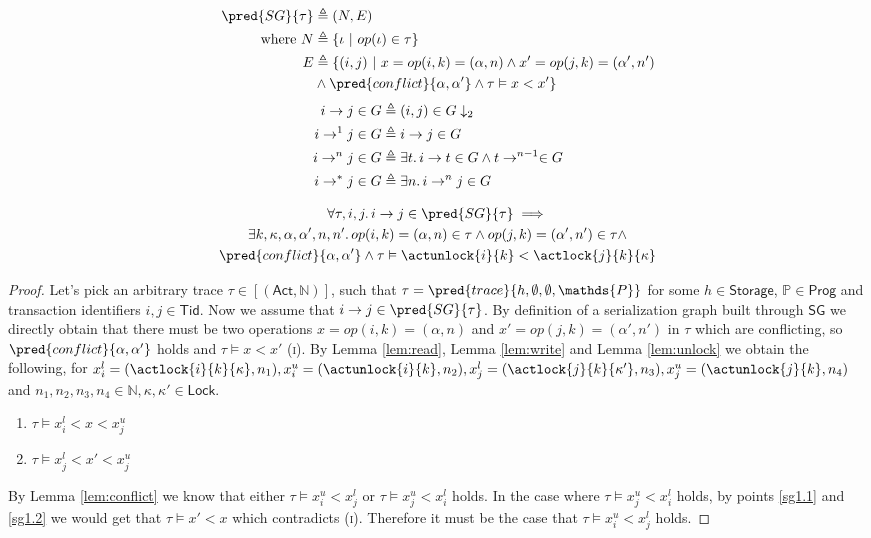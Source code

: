 \begin{align*}
\pred{SG}{\tau} &\triangleq (N, E) \\
\text{where } N &\triangleq \{ \iota\ |\ op(\iota) \in \tau \} \\
E &\triangleq \{ (i, j)\ |\ x = op(i, k) = (\alpha, n) \land x' = op(j, k) = (\alpha', n') \\ &\land \pred{conflict}{\alpha, \alpha'} \land \tau \vDash x < x' \}
\end{align*}
\begin{align*}
i \rightarrow j \in G &\triangleq (i, j) \in G \downarrow_2
\\
i \rightarrow^1 j \in G &\triangleq i \rightarrow j \in G
\\
i \rightarrow^n j \in G &\triangleq \exists t \ldotp i \rightarrow t \in G \land t \rightarrow^{n-1} \in G
\\
i \rightarrow^* j \in G &\triangleq \exists n \ldotp i \rightarrow^n j \in G
\end{align*}

\lem \label{lem:sg1}
\begin{gather*}
\forall \tau, i, j \ldotp i \rightarrow j \in \pred{SG}{\tau} \implies \\
\exists k, \kappa, \alpha, \alpha', n, n' \ldotp op(i, k) = (\alpha, n) \in \tau \land op(j, k) = (\alpha', n') \in \tau \land \\
\pred{conflict}{\alpha, \alpha'} \land \tau \vDash \actunlock{i}{k} < \actlock{j}{k}{\kappa}
\end{gather*}
\begin{proof}
Let's pick an arbitrary trace $\tau \in [(\mathsf{Act}, \mathds{N})]$, such that $\tau = \pred{trace}{h, \emptyset, \emptyset, \mathds{P}}$ for some $h \in \mathsf{Storage}$, $\mathds{P} \in \mathsf{Prog}$ and transaction identifiers $i, j \in \mathsf{Tid}$. Now we assume that $i \rightarrow j \in \pred{SG}{\tau}$. By definition of a serialization graph built through $\mathsf{SG}$ we directly obtain that there must be two operations $x = op(i, k) = (\alpha, n)$ and $x' = op(j, k) = (\alpha', n')$ in $\tau$ which are conflicting, so $\pred{conflict}{\alpha, \alpha'}$ holds and $\tau \vDash x < x'$ (\textsc{i}). By Lemma \ref{lem:read}, Lemma \ref{lem:write} and Lemma \ref{lem:unlock} we obtain the following, for $x_i^l = (\actlock{i}{k}{\kappa}, n_1), x_i^u = (\actunlock{i}{k}, n_2), x_j^l = (\actlock{j}{k}{\kappa'}, n_3), x_j^u = (\actunlock{j}{k}, n_4)$ and $n_1, n_2, n_3, n_4 \in \mathds{N}, \kappa, \kappa' \in \mathsf{Lock}$.
\begin{enumerate}
\item \label{sg1.1} $\tau \vDash x_i^l < x < x_j^u$
\item \label{sg1.2} $\tau \vDash x_j^l < x' < x_j^u$
\end{enumerate}
By Lemma \ref{lem:conflict} we know that either $\tau \vDash x_i^u < x_j^l$ or $\tau \vDash x_j^u < x_i^l$ holds. In the case where $\tau \vDash x_j^u < x_i^l$ holds, by points \ref{sg1.1} and \ref{sg1.2} we would get that $\tau \vDash x' < x$ which contradicts (\textsc{i}). Therefore it must be the case that $\tau \vDash x_i^u < x_j^l$ holds.
\end{proof}

